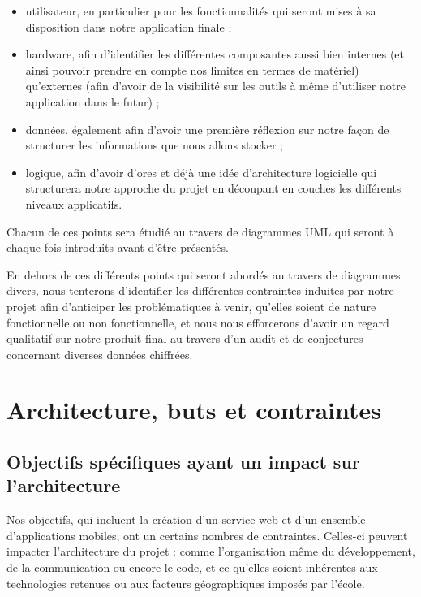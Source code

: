 \documentclass{life-fr}
\begin{document}
\begin{itemize}
      \item utilisateur,  en particulier pour les fonctionnalités qui seront mises à sa disposition dans notre application finale ;
      \item hardware, afin d'identifier les différentes composantes aussi bien internes (et ainsi pouvoir prendre en compte nos limites en termes de matériel) qu'externes (afin d'avoir de la visibilité sur les outils à même d'utiliser notre application dans le futur) ;
      \item données, également afin d'avoir une première réflexion sur notre façon de structurer les informations que nous allons stocker ;
      \item logique, afin d'avoir d'ores et déjà une idée d'architecture logicielle qui structurera notre approche du projet en découpant en couches les différents niveaux applicatifs.
\end{itemize}

Chacun de ces points sera étudié au travers de diagrammes UML qui seront à chaque fois introduits avant d'être présentés.

En dehors de ces différents points qui seront abordés au travers de diagrammes divers, nous tenterons d'identifier les différentes contraintes induites par notre projet afin d'anticiper les problématiques à venir, qu'elles soient de nature fonctionnelle ou non fonctionnelle, et nous nous efforcerons d'avoir un regard qualitatif sur notre produit final au travers d'un audit et de conjectures concernant diverses données chiffrées.



\chapter{Architecture, buts et contraintes}
\section{Objectifs spécifiques ayant un impact sur l’architecture}

Nos objectifs, qui incluent la création d'un service web et d'un ensemble d'applications mobiles, ont un certains nombres de contraintes. Celles-ci peuvent impacter l'architecture du projet : comme l'organisation même du développement, de la communication ou encore le code, et ce qu'elles soient inhérentes aux technologies retenues ou aux facteurs géographiques imposés par l'école.
\end{document}
